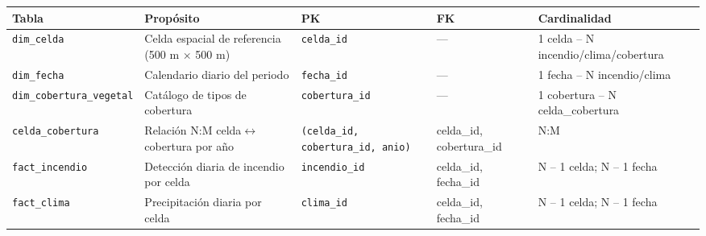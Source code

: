 \documentclass[11pt,a4paper]{article}
\begin{document}
\begin{center}
\scriptsize
\begin{tabular}{@{}L{3.2cm}L{3.8cm}L{1.8cm}L{2.6cm}L{3.4cm}@{}}
\toprule
\textbf{Tabla} & \textbf{Prop\'osito} & \textbf{PK} & \textbf{FK} & \textbf{Cardinalidad} \\
\midrule
\texttt{dim\_celda} & Celda espacial de referencia (500 m $\times$ 500 m) & \texttt{celda\_id} & --- & 1 celda -- N incendio/clima/cobertura \\
\texttt{dim\_fecha} & Calendario diario del periodo & \texttt{fecha\_id} & --- & 1 fecha -- N incendio/clima \\
\texttt{dim\_cobertura\_vegetal} & Cat\'alogo de tipos de cobertura & \texttt{cobertura\_id} & --- & 1 cobertura -- N celda\_cobertura \\
\texttt{celda\_cobertura} & Relaci\'on N:M celda$\leftrightarrow$cobertura por a\~no & \texttt{(celda\_id, cobertura\_id, anio)} & celda\_id, cobertura\_id & N:M \\
\texttt{fact\_incendio} & Detecci\'on diaria de incendio por celda & \texttt{incendio\_id} & celda\_id, fecha\_id & N -- 1 celda; N -- 1 fecha \\
\texttt{fact\_clima} & Precipitaci\'on diaria por celda & \texttt{clima\_id} & celda\_id, fecha\_id & N -- 1 celda; N -- 1 fecha \\
\bottomrule
\end{tabular}
\end{center}
\end{document}
